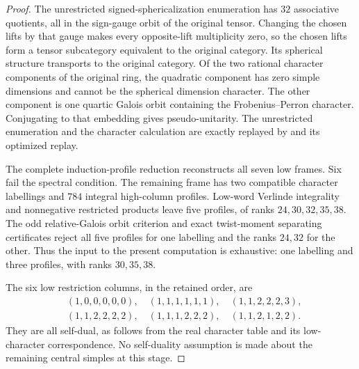 \begin{proof}
The unrestricted signed-sphericalization enumeration has $32$ associative
quotients, all in the sign-gauge orbit of the original tensor. Changing
the chosen lifts by that gauge makes every opposite-lift multiplicity
zero, so the chosen lifts form a tensor subcategory equivalent to the
original category. Its spherical structure transports to the original
category. Of the two rational character components of the original
ring, the quadratic component has zero simple dimensions and cannot be
the spherical dimension character. The other component is one quartic
Galois orbit containing the Frobenius--Perron character. Conjugating to
that embedding gives pseudo-unitarity. The unrestricted enumeration and
the character calculation are exactly replayed by
 and its
optimized replay.

The complete induction-profile reduction reconstructs all seven low
frames. Six fail the spectral condition. The remaining frame has two
compatible character labellings and $784$ integral high-column profiles.
Low-word Verlinde integrality and nonnegative restricted products leave
five profiles, of ranks $24,30,32,35,38$. The odd relative-Galois orbit
criterion and exact twist-moment separating certificates reject all five
profiles for one labelling and the ranks $24,32$ for the other. Thus the
input to the present computation is exhaustive: one labelling and three
profiles, with ranks $30,35,38$.

The six low restriction columns, in the retained order, are
\[
\begin{split}
 &(1,0,0,0,0,0),\quad (1,1,1,1,1,1),\quad
 (1,1,2,2,2,3),\\
 &(1,1,2,2,2,2),\quad (1,1,1,2,2,2),\quad
 (1,1,2,1,2,2).
\end{split}
\]
They are all self-dual, as follows from the real character table and its
low-character correspondence. No self-duality assumption is made about
the remaining central simples at this stage.


\end{proof}
